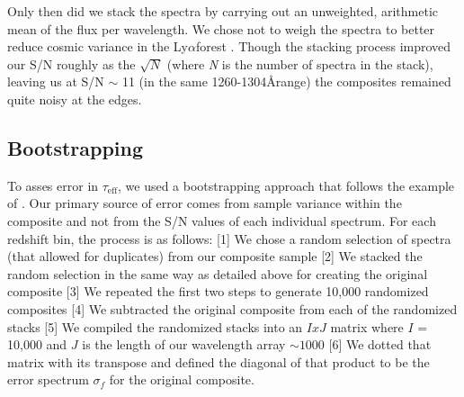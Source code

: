 \documentclass[preprint2,times,tighten]{aastex6}
\newcommand{\teff}{$\tau_\mathrm{eff}$\space}
\newcommand{\lya}{Ly$\alpha$\space}
\begin{document}
Only then did we stack the spectra by carrying out an unweighted, arithmetic mean of the flux per wavelength. We chose not to weigh the spectra to better reduce cosmic variance in the \lya forest \citep{becker_refined_2013}. Though the stacking process improved our S/N roughly as the $\sqrt{\textit{N}}$ (where \textit{N} is the number of spectra in the stack), leaving us at S/N $\sim$ 11 (in the same 1260-1304\AA range) the composites remained quite noisy at the edges.

\subsection{Bootstrapping}
\label{subsec:bootstrap}

To asses error in \teff, we used a bootstrapping approach that follows the example of \cite{worseck_giant_2014}. Our primary source of error comes from sample variance within the composite and not from the S/N values of each individual spectrum. For each redshift bin, the process is as follows: [1] We chose a random selection of spectra (that allowed for duplicates) from our composite sample [2] We stacked the random selection in the same way as detailed above for creating the original composite [3] We repeated the first two steps to generate 10,000 randomized composites [4] We subtracted the original composite from each of the randomized stacks [5] We compiled the randomized stacks into an $I x J$ matrix where $I$ = 10,000 and $J$ is the length of our wavelength array $\sim 1000$ [6] We dotted that matrix with its transpose and defined the diagonal of that product to be the error spectrum $\sigma_{f}$ for the original composite.
\end{document}
